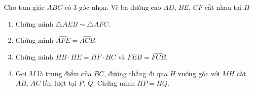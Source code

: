 \begin{ex}
		Cho tam giác $ABC$ có $3$ góc nhọn. Vẽ ba đường cao $AD$, $BE$, $CF$ cắt nhau tại $H$
		\begin{enumerate}
			\item Chứng minh $\triangle AEB\sim\triangle AFC$.
			\item Chứng minh $\widehat{AFE}=\widehat{ACB}$.
			\item Chứng minh $HB\cdot HE=HF\cdot HC$ và $\widehat{FEB}=\widehat{FCB}$.
			\item Gọi $M$ là trung điểm của $BC$, đường thẳng đi qua $H$ vuông góc với $MH$ cắt $AB$, $AC$ lần lượt tại $P$, $Q$. Chứng minh $HP=HQ$.
		\end{enumerate}
\end{ex}
